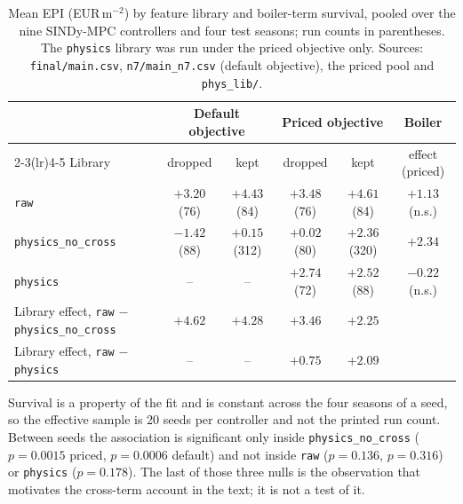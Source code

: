 \begin{table}[t]
\centering
\caption{Mean EPI (EUR\,m$^{-2}$) by feature library and boiler-term survival, pooled over
the nine SINDy-MPC controllers and four test seasons; run counts in parentheses. The
\texttt{physics} library was run under the priced objective only. Sources:
\texttt{final/main.csv}, \texttt{n7/main\_n7.csv} (default objective), the priced pool and
\texttt{phys\_lib/}.}
\label{tab:twobytwo}
\small
\begin{tabular}{@{}lccccc@{}}
\toprule
 & \multicolumn{2}{c}{Default objective} & \multicolumn{2}{c}{Priced objective} & Boiler \\
\cmidrule(lr){2-3}\cmidrule(lr){4-5}
Library & dropped & kept & dropped & kept & effect (priced) \\
\midrule
\texttt{raw}                & $+3.20$ (76) & $+4.43$ (84)  & $+3.48$ (76) & $\mathbf{+4.61}$ (84) & $+1.13$ (n.s.) \\
\texttt{physics\_no\_cross} & $-1.42$ (88) & $+0.15$ (312) & $+0.02$ (80) & $+2.36$ (320) & $\mathbf{+2.34}$ \\
\texttt{physics}            & -- & -- & $+2.74$ (72) & $+2.52$ (88)  & $-0.22$ (n.s.) \\
\midrule
Library effect, \texttt{raw} $-$ \texttt{physics\_no\_cross} & $+4.62$ & $+4.28$ & $+3.46$ & $+2.25$ & \\
Library effect, \texttt{raw} $-$ \texttt{physics}            & -- & -- & $+0.75$ & $+2.09$ & \\
\bottomrule
\end{tabular}

\vspace{2pt}
\begin{minipage}{\linewidth}\footnotesize
Survival is a property of the fit and is constant across the four seasons of a seed, so
the effective sample is 20 seeds per controller and not the printed run count. Between
seeds the association is significant only inside \texttt{physics\_no\_cross}
($p=0.0015$ priced, $p=0.0006$ default) and not inside \texttt{raw} ($p=0.136$, $p=0.316$)
or \texttt{physics} ($p=0.178$). The last of those three nulls is the observation that
motivates the cross-term account in the text; it is not a test of it.
\end{minipage}
\end{table}

